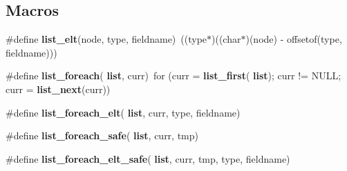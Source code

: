 \subsection*{Macros}
\begin{DoxyCompactItemize}
\item 
\#define \textbf{ list\+\_\+elt}(node,  type,  fieldname)~((type$\ast$)((char$\ast$)(node) -\/ offsetof(type, fieldname)))
\item 
\#define \textbf{ list\+\_\+foreach}(\textbf{ list},  curr)~for (curr = \textbf{ list\+\_\+first}(\textbf{ list}); curr != N\+U\+LL; curr = \textbf{ list\+\_\+next}(curr))
\item 
\#define \textbf{ list\+\_\+foreach\+\_\+elt}(\textbf{ list},  curr,  type,  fieldname)
\item 
\#define \textbf{ list\+\_\+foreach\+\_\+safe}(\textbf{ list},  curr,  tmp)
\item 
\#define \textbf{ list\+\_\+foreach\+\_\+elt\+\_\+safe}(\textbf{ list},  curr,  tmp,  type,  fieldname)
\end{DoxyCompactItemize}
